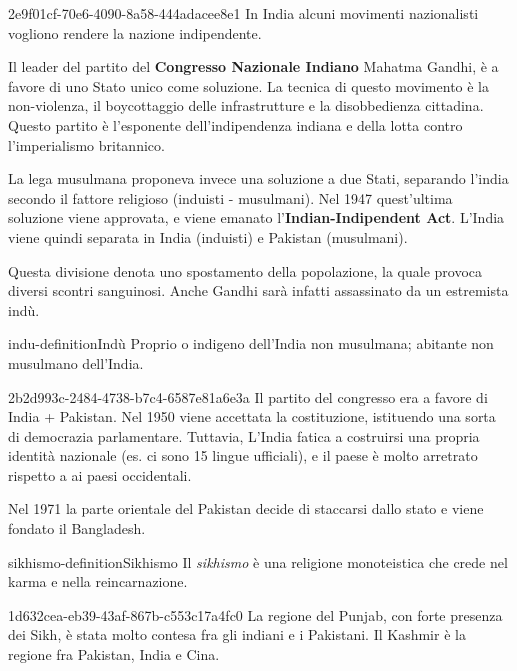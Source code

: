 \documentclass[preview]{standalone}
\begin{document}
\begin{snippet}{2e9f01cf-70e6-4090-8a58-444adacee8e1}
    In India alcuni movimenti nazionalisti vogliono
    rendere la nazione indipendente. 
    
    Il leader del partito del \textbf{Congresso Nazionale Indiano} Mahatma Gandhi,
    è a favore di uno Stato unico come soluzione.
    La tecnica di questo movimento è la non-violenza, il boycottaggio
    delle infrastrutture e la disobbedienza cittadina.
    Questo partito è l'esponente dell'indipendenza indiana e della lotta contro l'imperialismo britannico.
    
    La lega musulmana proponeva invece una soluzione a due Stati,
    separando l'india secondo il fattore religioso (induisti - musulmani).
    Nel 1947 quest'ultima soluzione viene approvata, e viene emanato
    l'\textbf{Indian-Indipendent Act}. 
    L'India viene quindi separata in India (induisti) e Pakistan (musulmani).
    
    Questa divisione denota uno spostamento della popolazione,
    la quale provoca diversi scontri sanguinosi.
    Anche Gandhi sarà infatti assassinato da un estremista indù.
\end{snippet}

\begin{snippetdefinition}{indu-definition}{Indù}
    Proprio o indigeno dell'India non musulmana; abitante non musulmano dell'India.
\end{snippetdefinition}

\begin{snippet}{2b2d993c-2484-4738-b7c4-6587e81a6e3a}
    Il partito del congresso era a favore di India + Pakistan. 
    Nel 1950 viene accettata la costituzione, istituendo una sorta di democrazia parlamentare.
    Tuttavia, L'India fatica a costruirsi una propria identità nazionale (es. ci sono 15 lingue ufficiali),
    e il paese è molto arretrato rispetto a ai paesi occidentali.

    Nel 1971 la parte orientale del Pakistan decide di staccarsi dallo stato e viene fondato
    il Bangladesh.
\end{snippet}

\begin{snippetdefinition}{sikhismo-definition}{Sikhismo}
    Il \textit{sikhismo} è una religione monoteistica che crede nel karma e nella reincarnazione.
\end{snippetdefinition}

\begin{snippet}{1d632cea-eb39-43af-867b-c553c17a4fc0}
    La regione del Punjab, con forte presenza dei Sikh, è stata molto contesa fra gli
    indiani e i Pakistani.
    Il Kashmir è la regione fra Pakistan, India e Cina.
\end{snippet}
\end{document}
